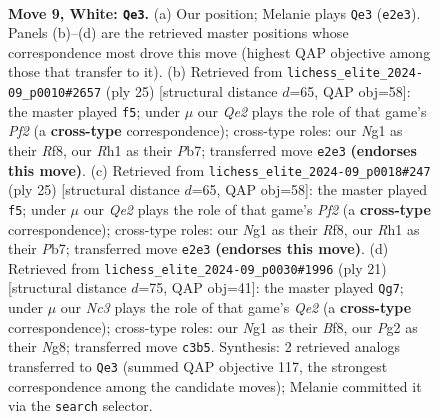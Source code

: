 \documentclass[11pt]{article}
\begin{document}
\clearpage

\begin{figure}[p]\centering
\begin{subfigure}{0.46\textwidth}\centering
\resizebox{\linewidth}{!}{%
\newchessgame
\chessboard[
  setfen={rnb1r1k1/pppnqppp/4p3/3pP3/3P4/2N5/PPP1QPPP/2KR1BNR w - - 4 9},
  showmover=false,
  pgfstyle=straightmove, color=movearrow, markmove={e2-e3}
]}
\caption{}
\end{subfigure}\hfill
\begin{subfigure}{0.46\textwidth}\centering
\resizebox{\linewidth}{!}{%
\newchessgame
\chessboard[
  setfen={r2q1rk1/1pp2pp1/2n1b2p/p2np3/8/2PPPN1P/PPB3P1/RN2QRK1 b - - 1 13},
  showmover=false,
  pgfstyle=straightmove, color=movearrow, markmove={f7-f5}
]}
\caption{}
\end{subfigure}
\\[4pt]
\begin{subfigure}{0.46\textwidth}\centering
\resizebox{\linewidth}{!}{%
\newchessgame
\chessboard[
  setfen={r2q1rk1/1pp2pp1/2n1b2p/p2np3/8/2PPPN1P/PPB3P1/RN2QRK1 b - - 1 13},
  showmover=false,
  pgfstyle=straightmove, color=movearrow, markmove={f7-f5}
]}
\caption{}
\end{subfigure}\hfill
\begin{subfigure}{0.46\textwidth}\centering
\resizebox{\linewidth}{!}{%
\newchessgame
\chessboard[
  setfen={2kr1bnr/pbppq3/1pn1pp2/7p/PP2P2N/2PP2P1/3N1PB1/R1BQK2R b KQ - 0 11},
  showmover=false,
  pgfstyle=straightmove, color=movearrow, markmove={e7-g7}
]}
\caption{}
\end{subfigure}
\caption{\textbf{Move 9, White: \texttt{Qe3}.} (a) Our position; Melanie plays \texttt{Qe3} (\texttt{e2e3}). Panels (b)--(d) are the retrieved master positions whose correspondence most drove this move (highest QAP objective among those that transfer to it). (b) Retrieved from \texttt{lichess\_elite\_2024-09\_p0010\#2657} (ply 25) [structural distance $d$=65, QAP obj=58]: the master played \texttt{f5}; under $\mu$ our \emph{Qe2} plays the role of that game's \emph{Pf2} (a \textbf{cross-type} correspondence); cross-type roles: our \emph{N}g1 as their \emph{R}f8, our \emph{R}h1 as their \emph{P}b7; transferred move \texttt{e2e3} \textbf{(endorses this move)}. (c) Retrieved from \texttt{lichess\_elite\_2024-09\_p0018\#247} (ply 25) [structural distance $d$=65, QAP obj=58]: the master played \texttt{f5}; under $\mu$ our \emph{Qe2} plays the role of that game's \emph{Pf2} (a \textbf{cross-type} correspondence); cross-type roles: our \emph{N}g1 as their \emph{R}f8, our \emph{R}h1 as their \emph{P}b7; transferred move \texttt{e2e3} \textbf{(endorses this move)}. (d) Retrieved from \texttt{lichess\_elite\_2024-09\_p0030\#1996} (ply 21) [structural distance $d$=75, QAP obj=41]: the master played \texttt{Qg7}; under $\mu$ our \emph{Nc3} plays the role of that game's \emph{Qe2} (a \textbf{cross-type} correspondence); cross-type roles: our \emph{N}g1 as their \emph{B}f8, our \emph{P}g2 as their \emph{N}g8; transferred move \texttt{c3b5}. Synthesis: 2 retrieved analogs transferred to \texttt{Qe3} (summed QAP objective 117, the strongest correspondence among the candidate moves); Melanie committed it via the \texttt{search} selector.}

\end{figure}
\end{document}
